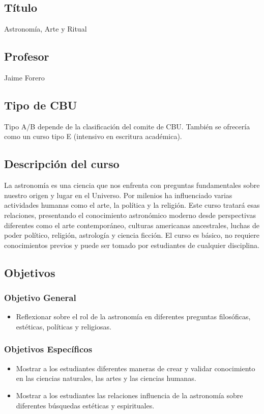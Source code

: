 \documentclass{report}
\begin{document}
\subsection*{\bf T\'itulo}
Astronom\'ia, Arte y Ritual\\

\subsection*{\bf Profesor}
Jaime Forero\\

\subsection*{Tipo de CBU}
Tipo A/B depende de la clasificaci\'on del comite de CBU. Tambi\'en se
ofrecer\'ia como un curso tipo E (intensivo en escritura acad\'emica). 

\subsection*{Descripci\'on del curso}
La astronom\'ia es una ciencia que nos enfrenta con preguntas
fundamentales sobre nuestro origen y lugar en el Universo. Por
milenios ha influenciado varias actividades humanas como el arte, la
pol\'itica y la religi\'on. Este curso tratar\'a esas relaciones,
presentando el conocimiento astron\'omico moderno desde perspectivas
diferentes como el arte contempor\'aneo, culturas americanas
ancestrales, luchas de poder pol\'itico, religi\'on, astrolog\'ia y ciencia
ficci\'on. El curso es b\'asico, no requiere conocimientos previos y
puede ser tomado por estudiantes de cualquier disciplina.   
\subsection*{Objetivos}

\subsubsection*{Objetivo General}
\begin{itemize}
\item Reflexionar sobre el rol de la astronom\'ia en diferentes
  preguntas filos\'oficas, est\'eticas, pol\'iticas y religiosas. 
\end{itemize}

\subsubsection*{Objetivos Espec\'ificos}
\begin{itemize}
\item Mostrar a los estudiantes diferentes maneras de crear
  y validar conocimiento en las ciencias naturales, las artes y las
  ciencias humanas. 
\item Mostrar a los estudiantes las relaciones influencia de la
  astronom\'ia sobre diferentes b\'usquedas est\'eticas y
  espirituales.  
\end{itemize}
\end{document}
